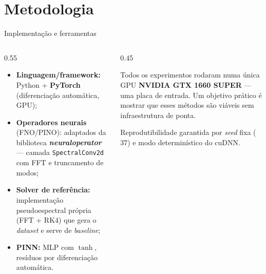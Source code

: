 \section{Metodologia}

\begin{frame}{Implementação e ferramentas}
  \begin{columns}[T,totalwidth=\textwidth]
    \begin{column}{0.55\textwidth}
      \begin{itemize}
        \item \textbf{Linguagem/framework:} Python + \textbf{PyTorch} (diferenciação
              automática, GPU);
        \item \textbf{Operadores neurais} (FNO/PINO): adaptados da biblioteca
              \textbf{\emph{neuraloperator}} --- camada \texttt{SpectralConv2d} com FFT e
              truncamento de modos;
        \item \textbf{Solver de referência:} implementação pseudoespectral própria
              (FFT + RK4) que gera o \emph{dataset} e serve de \emph{baseline};
        \item \textbf{PINN:} MLP com $\tanh$, resíduos por diferenciação automática.
      \end{itemize}
    \end{column}
    \begin{column}{0.45\textwidth}
      \begin{information}
        Todos os experimentos rodaram numa única GPU \textbf{NVIDIA GTX 1660 SUPER} --- uma
        placa de entrada. Um objetivo prático é mostrar que esses métodos são viáveis
        \alert{sem infraestrutura de ponta}.
      \end{information}
      \begin{remark}
        Reprodutibilidade garantida por \emph{seed} fixa ($37$) e modo determinístico do
        cuDNN.
      \end{remark}
    \end{column}
  \end{columns}
\end{frame}

